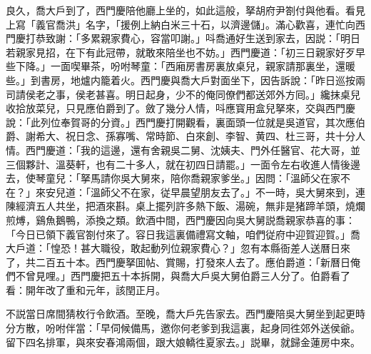 良久，喬大戶到了，西門慶陪他廳上坐的，如此這般，拏胡府尹劄付與他看。看見上寫「義官喬洪」名字，「援例上納白米三十石，以濟邊儲」。滿心歡喜，連忙向西門慶打恭致謝：「多累親家費心，容當叩謝。」呌喬通好生送到家去，因説：「明日若親家見招，在下有此冠帶，就敢來陪坐也不妨。」西門慶道：「初三日親家好歹早些下降。」一面喫畢茶，吩咐琴童：「西廂房書房裏放桌兒，親家請那裏坐，還暖些。」到書房，地爐内籠着火。西門慶與喬大戶對面坐下，因告訴說：「昨日巡按兩司請侯老之事，侯老甚喜。明日起身，少不的俺同僚們都送郊外方囘。」纔抹桌兒收拾放菜兒，只見應伯爵到了。斂了幾分人情，呌應寳用盒兒拏來，交與西門慶說：「此列位奉賀哥的分資。」西門慶打開觀看，裏面頭一位就是吳道官，其次應伯爵、謝希大、祝日念、孫寡嘴、常時節、白來創、李智、黄四、杜三哥，共十分人情。西門慶道：「我的這邊，還有舍親吳二舅、沈姨夫、門外任醫官、花大哥，並三個夥計、溫葵軒，也有二十多人，就在初四日請罷。」一面令左右收進人情後邊去，使琴童兒：「拏馬請你吳大舅來，陪你喬親家爹坐。」因問：「溫師父在家不在？」來安兒道：「溫師父不在家，従早晨望朋友去了。」不一時，吳大舅來到，連陳經濟五人共坐，把酒來斟。桌上擺列許多熱下飯、湯碗，無非是猪蹄羊頭，燒爛煎煿，鷄魚鵝鴨，添換之類。飲酒中間，西門慶因向吳大舅説喬親家恭喜的事：「今日已領下義官劄付來了。容日我這裏備禮寫文軸，咱們従府中迎賀迎賀。」喬大戶道：「惶恐！甚大職役，敢起動列位親家費心？」忽有本縣衙差人送曆日來了，共二百五十本。西門慶拏囬帖、賞賜，打發來人去了。應伯爵道：「新曆日俺們不曾見哩。」西門慶把五十本拆開，與喬大戶吳大舅伯爵三人分了。伯爵看了看：開年改了重和元年，該閏正月。

不説當日席間猜枚行令飲酒。至晚，喬大戶先告家去。西門慶陪吳大舅坐到起更時分方散，吩咐伴當：「早伺候備馬，邀你何老爹到我這裏，起身同徃郊外送侯爺。留下四名排軍，與來安春鴻兩個，跟大娘轎徃夏家去。」説畢，就歸金蓮房中來。

